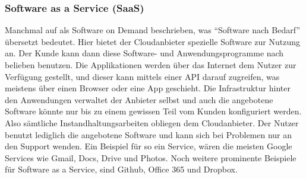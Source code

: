 \subsubsection{Software as a Service (SaaS)}
Manchmal auf als Software on Demand beschrieben, was "`Software nach Bedarf"' übersetzt bedeutet. Hier bietet der Cloudanbieter spezielle Software zur Nutzung an. Der Kunde kann dann diese Software- und Anwendungsprogramme nach belieben benutzen. Die Applikationen werden über das Internet dem Nutzer zur Verfügung gestellt, und dieser kann mittels einer API darauf zugreifen, was meistens über einen Browser oder eine App geschieht. Die Infrastruktur hinter den Anwendungen verwaltet der Anbieter selbst und auch die angebotene Software könnte nur bis zu einem gewissen Teil vom Kunden konfiguriert werden. Also sämtliche Instandhaltungsarbeiten obliegen dem Cloudanbieter. Der Nutzer benutzt lediglich die angebotene Software und kann sich bei Problemen nur an den Support wenden.\newline
\newline
Ein Beispiel für so ein Service, wären die meisten Google Services wie Gmail, Docs, Drive und Photos. Noch weitere prominente Beispiele für Software as a Service, sind Github, Office 365 und Dropbox.


